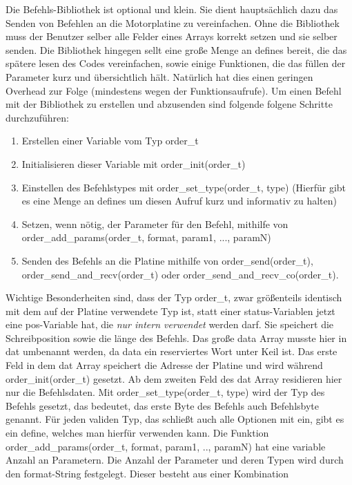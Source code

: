 \documentclass[a4paper]{article}
\begin{document}
	Die Befehls-Bibliothek ist optional und klein. Sie dient hauptsächlich dazu das Senden von Befehlen an
	die Motorplatine zu vereinfachen. Ohne die Bibliothek muss der Benutzer selber alle Felder eines Arrays
	korrekt setzen und sie selber senden. Die Bibliothek hingegen sellt eine große Menge an defines bereit,
	die das spätere lesen des Codes vereinfachen, sowie einige Funktionen, die das füllen der Parameter
	kurz und übersichtlich hält. Natürlich hat dies einen geringen Overhead zur Folge (mindestens wegen der
	Funktionsaufrufe).
	Um einen Befehl mit der Bibliothek zu erstellen und abzusenden sind folgende folgene Schritte durchzuführen:
	\begin{enumerate}
		\item Erstellen einer Variable vom Typ order\_t
		\item Initialisieren dieser Variable mit order\_init(order\_t)
		\item Einstellen des Befehlstypes mit order\_set\_type(order\_t, type) (Hierfür gibt es eine Menge an defines
			um diesen Aufruf kurz und informativ zu halten)
		\item Setzen, wenn nötig, der Parameter für den Befehl, mithilfe von order\_add\_params(order\_t, format, param1, ..., paramN)
		\item Senden des Befehls an die Platine mithilfe von order\_send(order\_t), order\_send\_and\_recv(order\_t) oder
			order\_send\_and\_recv\_co(order\_t).
	\end{enumerate}
	Wichtige Besonderheiten sind, dass der Typ order\_t, zwar größenteils identisch mit dem auf der Platine verwendete
	Typ ist, statt einer status-Variablen jetzt eine pos-Variable hat, die {\em nur intern verwendet} werden darf.
	Sie speichert die Schreibposition sowie die länge des Befehls. Das große data Array musste hier in dat umbenannt
	werden, da data ein reserviertes Wort unter Keil ist. Das erste Feld in dem dat Array speichert die Adresse der
	Platine und wird während order\_init(order\_t) gesetzt. Ab dem zweiten Feld des dat Array residieren hier nur die
	Befehlsdaten.
	Mit order\_set\_type(order\_t, type) wird der Typ des Befehls gesetzt, das bedeutet, das erste Byte des Befehls auch
	Befehlsbyte genannt. Für jeden validen Typ, das schließt auch alle Optionen mit ein, gibt es ein define, welches man
	hierfür verwenden kann.
	Die Funktion order\_add\_params(order\_t, format, param1, .., paramN) hat eine variable Anzahl an Parametern. Die
	Anzahl der Parameter und deren Typen wird durch den format-String festgelegt. Dieser besteht aus einer Kombination
\end{document}
